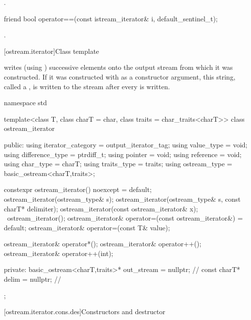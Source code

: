 \begin{itemdescr}
\pnum
\returns
{}.
\end{itemdescr}

%
\begin{itemdecl}
friend bool operator==(const istream_iterator& i, default_sentinel_t);
\end{itemdecl}

\begin{itemdescr}
\pnum
\returns
{}.
\end{itemdescr}

[ostream.iterator]{Class template }

\pnum
{}%
writes (using
)
successive elements onto the output stream from which it was constructed.
If it was constructed with
as a constructor argument, this string, called a
,
is written to the stream after every
is written.

\begin{codeblock}
namespace std {
  template<class T, class charT = char, class traits = char_traits<charT>>
  class ostream_iterator {
  public:
    using iterator_category = output_iterator_tag;
    using value_type        = void;
    using difference_type   = ptrdiff_t;
    using pointer           = void;
    using reference         = void;
    using char_type         = charT;
    using traits_type       = traits;
    using ostream_type      = basic_ostream<charT,traits>;

    constexpr ostream_iterator() noexcept = default;
    ostream_iterator(ostream_type& s);
    ostream_iterator(ostream_type& s, const charT* delimiter);
    ostream_iterator(const ostream_iterator& x);
    ~ostream_iterator();
    ostream_iterator& operator=(const ostream_iterator&) = default;
    ostream_iterator& operator=(const T& value);

    ostream_iterator& operator*();
    ostream_iterator& operator++();
    ostream_iterator& operator++(int);

  private:
    basic_ostream<charT,traits>* out_stream = nullptr;          // \expos
    const charT* delim = nullptr;                               // \expos
  };
}
\end{codeblock}

[ostream.iterator.cons.des]{Constructors and destructor}

